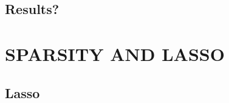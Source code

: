 \documentclass[a4paper,twoside]{article}
\begin{document}
\subsection{Results?}


\section{\uppercase{Sparsity and LASSO}}

\subsection{Lasso}



\vfill
\end{document}
